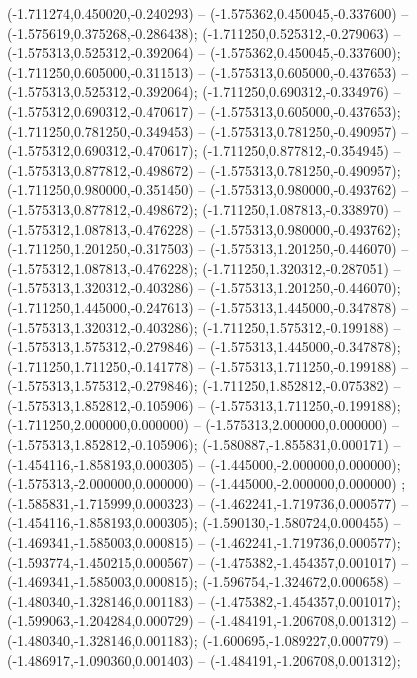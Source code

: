  (-1.711274,0.450020,-0.240293) -- (-1.575362,0.450045,-0.337600) -- (-1.575619,0.375268,-0.286438);
 (-1.711250,0.525312,-0.279063) -- (-1.575313,0.525312,-0.392064) -- (-1.575362,0.450045,-0.337600);
 (-1.711250,0.605000,-0.311513) -- (-1.575313,0.605000,-0.437653) -- (-1.575313,0.525312,-0.392064);
 (-1.711250,0.690312,-0.334976) -- (-1.575312,0.690312,-0.470617) -- (-1.575313,0.605000,-0.437653);
 (-1.711250,0.781250,-0.349453) -- (-1.575313,0.781250,-0.490957) -- (-1.575312,0.690312,-0.470617);
 (-1.711250,0.877812,-0.354945) -- (-1.575313,0.877812,-0.498672) -- (-1.575313,0.781250,-0.490957);
 (-1.711250,0.980000,-0.351450) -- (-1.575313,0.980000,-0.493762) -- (-1.575313,0.877812,-0.498672);
 (-1.711250,1.087813,-0.338970) -- (-1.575312,1.087813,-0.476228) -- (-1.575313,0.980000,-0.493762);
 (-1.711250,1.201250,-0.317503) -- (-1.575313,1.201250,-0.446070) -- (-1.575312,1.087813,-0.476228);
 (-1.711250,1.320312,-0.287051) -- (-1.575313,1.320312,-0.403286) -- (-1.575313,1.201250,-0.446070);
 (-1.711250,1.445000,-0.247613) -- (-1.575313,1.445000,-0.347878) -- (-1.575313,1.320312,-0.403286);
 (-1.711250,1.575312,-0.199188) -- (-1.575313,1.575312,-0.279846) -- (-1.575313,1.445000,-0.347878);
 (-1.711250,1.711250,-0.141778) -- (-1.575313,1.711250,-0.199188) -- (-1.575313,1.575312,-0.279846);
 (-1.711250,1.852812,-0.075382) -- (-1.575313,1.852812,-0.105906) -- (-1.575313,1.711250,-0.199188);
 (-1.711250,2.000000,0.000000) -- (-1.575313,2.000000,0.000000) -- (-1.575313,1.852812,-0.105906);
 (-1.580887,-1.855831,0.000171) -- (-1.454116,-1.858193,0.000305) -- (-1.445000,-2.000000,0.000000);
 (-1.575313,-2.000000,0.000000) -- (-1.445000,-2.000000,0.000000) ;
 (-1.585831,-1.715999,0.000323) -- (-1.462241,-1.719736,0.000577) -- (-1.454116,-1.858193,0.000305);
 (-1.590130,-1.580724,0.000455) -- (-1.469341,-1.585003,0.000815) -- (-1.462241,-1.719736,0.000577);
 (-1.593774,-1.450215,0.000567) -- (-1.475382,-1.454357,0.001017) -- (-1.469341,-1.585003,0.000815);
 (-1.596754,-1.324672,0.000658) -- (-1.480340,-1.328146,0.001183) -- (-1.475382,-1.454357,0.001017);
 (-1.599063,-1.204284,0.000729) -- (-1.484191,-1.206708,0.001312) -- (-1.480340,-1.328146,0.001183);
 (-1.600695,-1.089227,0.000779) -- (-1.486917,-1.090360,0.001403) -- (-1.484191,-1.206708,0.001312);
